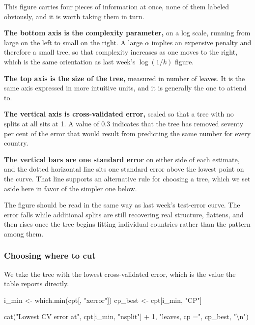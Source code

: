 \documentclass[
  a4paper,
]{scrbook}
\newenvironment{Shaded}{\begin{snugshade}}{\end{snugshade}}
\newcommand{\DecValTok}[1]{\textcolor[rgb]{0.68,0.00,0.00}{#1}}
\newcommand{\FunctionTok}[1]{\textcolor[rgb]{0.28,0.35,0.67}{#1}}
\newcommand{\NormalTok}[1]{\textcolor[rgb]{0.00,0.23,0.31}{#1}}
\newcommand{\OtherTok}[1]{\textcolor[rgb]{0.00,0.23,0.31}{#1}}
\newcommand{\SpecialCharTok}[1]{\textcolor[rgb]{0.37,0.37,0.37}{#1}}
\newcommand{\StringTok}[1]{\textcolor[rgb]{0.13,0.47,0.30}{#1}}
\newcounter{none} %
\begin{document}
This figure carries four pieces of information at once, none of them
labeled obviously, and it is worth taking them in turn.

\textbf{The bottom axis is the complexity parameter,} on a log scale,
running from large on the left to small on the right. A large \(\alpha\)
implies an expensive penalty and therefore a small tree, so that
complexity increases as one moves to the right, which is the same
orientation as last week's \(\log(1/k)\) figure.

\textbf{The top axis is the size of the tree,} measured in number of
leaves. It is the same axis expressed in more intuitive units, and it is
generally the one to attend to.

\textbf{The vertical axis is cross-validated error,} scaled so that a
tree with no splits at all sits at 1. A value of 0.3 indicates that the
tree has removed seventy per cent of the error that would result from
predicting the same number for every country.

\textbf{The vertical bars are one standard error} on either side of each
estimate, and the dotted horizontal line sits one standard error above
the lowest point on the curve. That line supports an alternative rule
for choosing a tree, which we set aside here in favor of the simpler one
below.

The figure should be read in the same way as last week's test-error
curve. The error falls while additional splits are still recovering real
structure, flattens, and then rises once the tree begins fitting
individual countries rather than the pattern among them.

\subsubsection{Choosing where to cut}\label{choosing-where-to-cut}

We take the tree with the lowest cross-validated error, which is the
value the table reports directly.

\begin{Shaded}
\begin{Highlighting}[]
\NormalTok{i\_min   }\OtherTok{\textless{}{-}} \FunctionTok{which.min}\NormalTok{(cpt[, }\StringTok{"xerror"}\NormalTok{])}
\NormalTok{cp\_best }\OtherTok{\textless{}{-}}\NormalTok{ cpt[i\_min, }\StringTok{"CP"}\NormalTok{]}

\FunctionTok{cat}\NormalTok{(}\StringTok{"Lowest CV error at"}\NormalTok{, cpt[i\_min, }\StringTok{"nsplit"}\NormalTok{] }\SpecialCharTok{+} \DecValTok{1}\NormalTok{, }\StringTok{"leaves, cp ="}\NormalTok{,}
\NormalTok{    cp\_best, }\StringTok{"}\SpecialCharTok{\textbackslash{}n}\StringTok{"}\NormalTok{)}
\end{Highlighting}
\end{Shaded}
\end{document}
